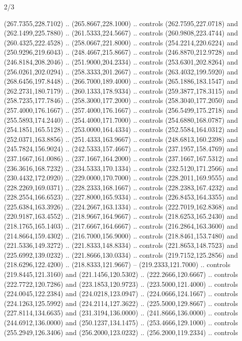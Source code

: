 \begin{flagdescription}{2/3}
\begin{scope}[xshift=0.5\flaglength,yshift=0.5\flagwidth,scale=\flagwidth/525.28]
\begin{scope}[y=0.1mm, x=0.1mm, yscale=-1,shift={(-381.5,-404)}]
\begin{scope}[shift={(5.25001,4.53053)},miter limit=4.00,line width=0.800\lw]
  (267.7355,228.7102) .. (265.8667,228.1000) .. controls (262.7595,227.0718) and
  (262.1499,225.7880) .. (261.5333,224.5667) .. controls (260.9808,223.4744) and
  (260.4325,222.4528) .. (258.0667,221.8000) .. controls (254.2214,220.6224) and
  (250.9296,219.6043) .. (248.4667,215.8667) .. controls (246.8870,212.9728) and
  (246.8184,208.2046) .. (251.9000,204.2334) .. controls (253.6301,202.8264) and
  (256.0261,202.0294) .. (258.3333,201.2667) .. controls (263.4032,199.5920) and
  (268.6456,197.8448) .. (266.7000,189.4000) .. controls (265.1886,183.1547) and
  (262.2731,180.7179) .. (260.1333,178.9334) .. controls (259.3877,178.3115) and
  (258.7235,177.7846) .. (258.3000,177.2000) .. controls (258.3040,177.2050) and
  (257.4000,176.1667) .. (257.4000,176.1667) .. controls (256.5499,175.2718) and
  (255.5893,174.2440) .. (254.4000,171.7000) .. controls (254.6880,168.0787) and
  (254.1851,165.5128) .. (253.0000,164.4334) .. controls (252.5584,164.0312) and
  (252.0371,163.8856) .. (251.4333,163.9667) .. controls (248.6813,160.2398) and
  (245.7824,156.9024) .. (242.5333,157.4667) .. controls (237.1957,158.4769) and
  (237.1667,161.0086) .. (237.1667,164.2000) .. controls (237.1667,167.5312) and
  (236.3616,168.7232) .. (234.5333,170.1334) .. controls (232.5120,171.2566) and
  (230.4432,172.0920) .. (229.0000,170.7000) .. controls (228.2011,169.9555) and
  (228.2269,169.0371) .. (228.2333,168.1667) .. controls (228.2383,167.4232) and
  (228.2554,166.6523) .. (227.8000,165.9334) .. controls (226.8453,164.3355) and
  (225.6384,163.3926) .. (224.2667,163.1334) .. controls (222.7019,162.8368) and
  (220.9187,163.4552) .. (218.9667,164.9667) .. controls (218.6253,165.2430) and
  (218.1765,165.1403) .. (217.6667,164.6667) .. controls (216.2864,163.3600) and
  (214.8664,159.4302) .. (216.7000,156.9000) .. controls (218.8461,153.7480) and
  (221.5336,149.3272) .. (221.8333,148.8334) .. controls (221.8653,148.7523) and
  (225.6992,139.0232) .. (221.8666,130.0334) .. controls (219.7152,125.2856) and
  (218.6296,122.4200) .. (218.8333,121.9667) -- (219.2333,121.7000) .. controls
  (219.8445,121.3160) and (221.1456,120.5302) .. (222.2666,120.6667) .. controls
  (222.7722,120.7286) and (223.1853,120.9723) .. (223.5000,121.4000) .. controls
  (224.0045,122.2384) and (224.0218,123.0947) .. (224.0666,124.1667) .. controls
  (224.1263,125.5992) and (224.2114,127.3622) .. (225.5000,129.8667) .. controls
  (227.8114,134.6635) and (231.3194,136.0000) .. (241.8666,136.0000) .. controls
  (244.6912,136.0000) and (250.1237,134.1475) .. (253.4666,129.1000) .. controls
  (255.2949,126.3406) and (256.2000,123.0232) .. (256.2000,119.2334) .. controls

\end{scope}
\end{scope}
\end{scope}
\end{flagdescription}
